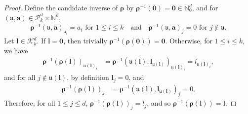\documentclass[10pt,a4paper]{amsart}
\begin{document}
\begin{proof} Define the candidate inverse of \(\boldsymbol{\rho}\) by \(\boldsymbol{\rho}^{-1}(\mathbf{0})=\mathbf{0}\in\mathbb{N}_0^d\), and for \((\mathfrak{u},\mathbf{a})\in\mathcal{P}^d_k\times\mathbb{N}^k\),
\begin{align}
    \boldsymbol{\rho}^{-1}(\mathfrak{u},\mathbf{a})_{\mathfrak{u}_i}=
        a_i \textrm{ for }1\leq i\leq k\quad\textrm{and}\quad\boldsymbol{\rho}^{-1}(\mathfrak{u},\mathbf{a})_j=0\textrm{ for }j\notin\mathfrak{u}.\nonumber
\end{align}
Let \(\boldsymbol{l}\in\mathcal{K}^d_k\). If \(\boldsymbol{l}=\mathbf{0}\), then trivially \(\boldsymbol{\rho}^{-1}(\boldsymbol{\rho}(\mathbf{0}))=\mathbf{0}\). Otherwise, for \(1\leq i\leq k\), we have
\begin{align}
    \boldsymbol{\rho}^{-1}(\boldsymbol{\rho}(\boldsymbol{l}))_{\mathfrak{u}(\boldsymbol{l})_i}&=\boldsymbol{\rho}^{-1}(\mathfrak{u}(\boldsymbol{l}),\boldsymbol{l}_{\mathfrak{u}(\boldsymbol{l})})_{\mathfrak{u}(\boldsymbol{l})_i}=l_{\mathfrak{u}(\boldsymbol{l})_i},\nonumber
\end{align}
and for all \(j\notin\mathfrak{u}(\boldsymbol{l})\), by definition \(\boldsymbol{l}_j=0\), and
\begin{align}
     \boldsymbol{\rho}^{-1}(\boldsymbol{\rho}(\boldsymbol{l}))_j&=\boldsymbol{\rho}^{-1}(\mathfrak{u}(\boldsymbol{l}),\boldsymbol{l}_{\mathfrak{u}(\boldsymbol{l})})_j=0.\nonumber
\end{align}
Therefore, for all \(1\leq j\leq d\), \(\boldsymbol{\rho}^{-1}(\boldsymbol{\rho}(\boldsymbol{l}))_j=l_j\), and so \(\boldsymbol{\rho}^{-1}(\boldsymbol{\rho}(\boldsymbol{l}))=\boldsymbol{l}\).


\end{proof}
\end{document}
